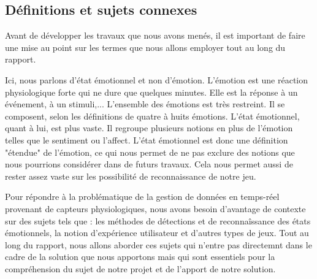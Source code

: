 \documentclass{article}
\begin{document}
	\subsection{Définitions et sujets connexes}\label{sec:connexe}
		Avant de développer les travaux que nous avons menés, il est important de faire une mise au point sur les termes que nous allons employer tout au long du rapport.\par
		Ici, nous parlons d'état émotionnel et non d'émotion.
		L'émotion est une réaction physiologique forte qui ne dure que quelques minutes.
		Elle est la réponse à un événement, à un stimuli,...
		L'ensemble des émotions est très restreint.
		Il se composent, selon les définitions de quatre à huits émotions.
		L'état émotionnel, quant à lui, est plus vaste. 
		Il regroupe plusieurs notions en plus de l'émotion telles que le sentiment ou l'affect. 
		L'état émotionnel est donc une définition "étendue" de l'émotion, ce qui nous permet de ne pas exclure des notions que nous pourrions considérer dans de futurs travaux.
		Cela nous permet aussi de rester assez vaste sur les possibilité de reconnaissance de notre jeu.\par
		Pour répondre à la problématique de la gestion de données en temps-réel provenant de capteurs physiologiques, nous avons besoin d'avantage de contexte sur des sujets tels que : les méthodes de détections et de reconnaîssance des états émotionnels, la notion d'expérience utilisateur et d'autres types de jeux.
		Tout au long du rapport, nous allons aborder ces sujets qui n'entre pas directemnt dans le cadre de la solution que nous apportons mais qui sont essentiels pour la compréhension du sujet de notre projet et de l'apport de notre solution.
\end{document}
